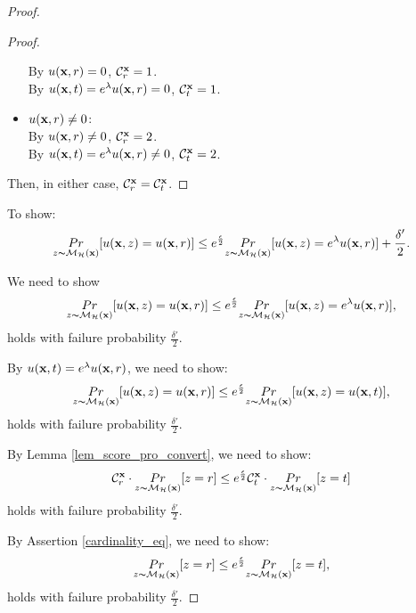 \documentclass{article}
\begin{document}
\begin{proof}
\begin{proof}
\begin{itemize}
        By $u(\textbf{x}, {r}) = 0$, $\mathcal{C}^{\textbf{x}}_{r} = 1$.\\
        By $u(\textbf{x}, {t}) = e^{\lambda} u(\textbf{x}, {r}) = 0$, $\mathcal{C}^{\textbf{x}}_{t} = 1$.

    \item {\boldmath$u(\textbf{x}, {r}) \neq 0$}:\\
        By $u(\textbf{x}, {r}) \neq 0$, $\mathcal{C}^{\textbf{x}}_{r} = 2$.\\
        By $u(\textbf{x}, {t}) = e^{\lambda} u(\textbf{x}, {r}) \neq 0$, $\mathcal{C}^{\textbf{x}}_{t} = 2$.
  \end{itemize}

  Then, in either case, $\mathcal{C}^{\textbf{x}}_{r} = \mathcal{C}^{\textbf{x}}_{t}$.

  \end{proof}

        To show:
        \begin{equation*}
        \underset{z \thicksim \mathcal{M}_{\mathcal{H}}(\textbf{x})}{Pr}[u(\textbf{x}, {z}) = u(\textbf{x}, {r})]
        \leq
        e^{\frac{\epsilon}{2}} \underset{z \thicksim \mathcal{M}_{\mathcal{H}}(\textbf{x})}{Pr}[u(\textbf{x}, {z}) = e^{\lambda} u(\textbf{x}, {r})] + \frac{\delta'}{2}.
        \end{equation*}

        We need to show 
        \begin{equation*}
        \underset{z \thicksim \mathcal{M}_{\mathcal{H}}(\textbf{x})}{Pr}[u(\textbf{x}, {z}) = u(\textbf{x}, {r})]
        \leq
        e^{\frac{\epsilon}{2}} \underset{z \thicksim \mathcal{M}_{\mathcal{H}}(\textbf{x})}{Pr}[u(\textbf{x}, {z}) = e^{\lambda} u(\textbf{x}, {r})],
        \end{equation*}
        holds with failure probability $\frac{\delta'}{2}$.

        By $u(\textbf{x}, {t}) = e^{\lambda} u(\textbf{x}, {r})$, we need to show:
        \begin{equation*}
         \underset{z \thicksim \mathcal{M}_{\mathcal{H}}(\textbf{x})}{Pr}[u(\textbf{x}, {z}) = u(\textbf{x}, {r})]
        \leq
        e^{\frac{\epsilon}{2}} \underset{z \thicksim \mathcal{M}_{\mathcal{H}}(\textbf{x})}{Pr}[u(\textbf{x}, {z}) = u(\textbf{x}, {t})],
        \end{equation*}
        holds with failure probability $\frac{\delta'}{2}$.

        By Lemma \ref{lem_score_pro_convert}, we need to show:
        \begin{equation*}
        \mathcal{C}^{\textbf{x}}_{r} \cdot \underset{z \thicksim \mathcal{M}_{\mathcal{H}}(\textbf{x})}{Pr}[z = r]
        \leq
        e^{\frac{\epsilon}{2}} \mathcal{C}^{\textbf{x}}_{t} \cdot \underset{z \thicksim \mathcal{M}_{\mathcal{H}}(\textbf{x})}{Pr}[z = t]
        \end{equation*}
        holds with failure probability $\frac{\delta'}{2}$.

        By Assertion \ref{cardinality_eq}, we need to show:
        \begin{equation*}
        \underset{z \thicksim \mathcal{M}_{\mathcal{H}}(\textbf{x})}{Pr}[z = r]
        \leq
        e^{\frac{\epsilon}{2}} \underset{z \thicksim \mathcal{M}_{\mathcal{H}}(\textbf{x})}{Pr}[z = t],
        \end{equation*}
        holds with failure probability $\frac{\delta'}{2}$.


\end{proof}
\end{document}
